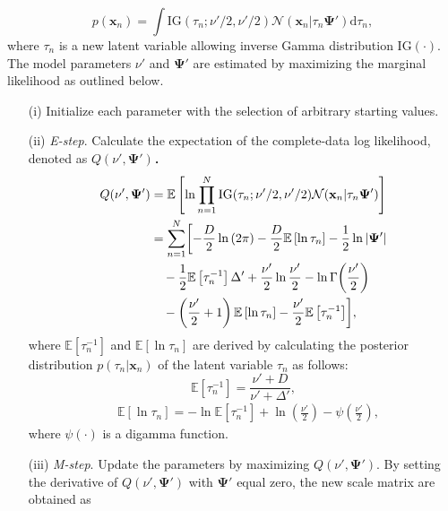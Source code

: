 \documentclass[journal]{IEEEtran}
\begin{document}
\begin{equation}%
\label{eq:eq11}
		p(\mathbf{x}_n) = \int \mathrm{IG}(\tau_n;\nu'/2,\nu'/2) \mathcal{N}(\mathbf{x}_n|\tau_n \mathbf{\Psi}') \mathrm{d}{\tau_n},
\end{equation}
where $\tau_n$ is a new latent variable allowing inverse Gamma distribution $\mathrm{IG(\cdot)}$.
The model parameters $\nu'$ and $\mathbf{\Psi}'$ are estimated by maximizing the marginal likelihood as outlined below.

\begin{enumerate}
\setlength{\parskip}{0cm}
\setlength{\itemsep}{0cm}
\item[(i)] Initialize each parameter with the selection of arbitrary starting values.
\item[(ii)] \textit{E-step}. Calculate the expectation of the complete-data log likelihood, denoted as $Q(\nu',\mathbf{\Psi}')$．
\begin{align}%
  Q(\nu',\mathbf{\Psi}')&=\mathbb{E} \left[\ln{\prod_{n=1}^{N}\mathrm{IG}(\tau_n;\nu'/2,\nu'/2) \mathcal{N}(\mathbf{x}_n|\tau_n \mathbf{\Psi}')}\right]  \notag  \\
  &=\sum_{n=1}^{N} \biggl[-\frac{D}{2}\ln{(2\pi)}-\frac{D}{2}\mathbb{E}\left[\ln{\tau_n}\right]-\frac{1}{2}\ln{|\mathbf{\Psi}'|} \notag \\
  &\quad-\frac{1}{2}\mathbb{E}\left[\tau^{-1}_n\right]\Delta'+\frac{\nu'}{2} \ln{\frac{\nu'}{2}} - \ln{\Gamma{\left(\frac{\nu'}{2}\right)}} \notag \\
  &\quad- \left(\frac{\nu'}{2}+1\right)\mathbb{E}\left[\ln{\tau_n}\right]-\frac{\nu'}{2}\mathbb{E}\left[\tau^{-1}_n \right] \biggr],
\end{align}
where $\mathbb{E}\left[\tau^{-1}_n\right]$ and $\mathbb{E}\left[\ln{\tau_n}\right]$ are derived by calculating the posterior distribution $p(\tau_n|\mathbf{x}_n)$ of the latent variable $\tau_n$ as follows:
\begin{equation}%
\mathbb{E}\left[\tau^{-1}_n\right]=\frac{\nu'+D}{\nu'+\Delta'},
\end{equation}
\begin{eqnarray}%
&\mathbb{E}\left[\ln{\tau_n}\right]=-\ln{\mathbb{E}\left[\tau^{-1}_n\right]}+\ln{\left(\frac{\nu'}{2}\right)}-{\psi}\left(\frac{\nu'}{2}\right),
\end{eqnarray}
where $\psi(\cdot)$ is a digamma function.
\item[(iii)] \textit{M-step}. Update the parameters by maximizing $Q(\nu',\mathbf{\Psi}')$.
By setting the derivative of $Q(\nu',\mathbf{\Psi}')$ with $\mathbf{\Psi}'$ equal zero, the new scale matrix are obtained as


\end{enumerate}
\end{document}
